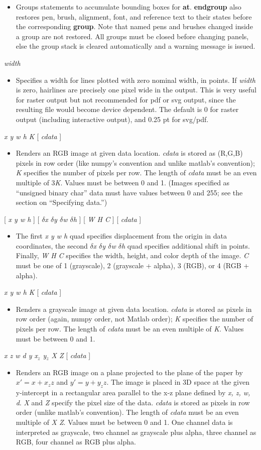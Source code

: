 \documentclass[11pt]{article}
\def\cmd#1#2{\noindent {\bf #1} #2\par}
\def\expl#1{\kern-8pt\begin{itemize}\item[]#1\end{itemize}}
\def\cref#1{{\bf #1}}
\begin{document}
\cmd{group}{}
\cmd{endgroup}{}
\expl{Groups statements to accumulate bounding boxes for
  \cref{at}. \cref{endgroup} also restores pen, brush, alignment,
  font, and
  reference text to their states before the corresponding
  \cref{group}. Note that named pens and brushes changed inside a
  group are not restored. All groups must be closed before changing
  panels, else the group stack is cleared automatically and a warning
  message is issued. }

\cmd{hairline}{\emph{width}} \expl{Specifies a width for lines plotted
  with zero nominal width, in points. If \emph{width} is zero,
  hairlines are precisely one pixel wide in the output. This is very
  useful for raster output but not recommended for pdf or svg output,
  since the resulting file would become device dependent. The default
  is 0 for raster output (including interactive output), and 0.25 pt
  for svg/pdf.}

\cmd{image}{\emph{x y w h K} [ \emph{cdata} ]} \expl{Renders an RGB
  image at given data location. \emph{cdata} is stored as (R,G,B)
  pixels in row order (like numpy's convention and unlike matlab's
  convention); \emph{K} specifies the number of pixels per row. The
  length of \emph{cdata} must be an even multiple of 3\emph{K}. Values
  must be between 0 and 1. (Images specified as ``unsigned  binary
  char'' data must have
  values between 0 and 255; see the section on ``Specifying data.'')}

\cmd{image}{[ \emph{x y w h} ]
  [ \emph{$\delta$x $\delta$y $\delta$w $\delta$h} ] [ \emph{W H C} ] [
    \emph{cdata} ]}
 \expl{The first \emph{x y w h} quad specifies displacement from the origin
in data coordinates, the second  \emph{$\delta$x $\delta$y $\delta$w
  $\delta$h} quad specifies additional shift in points. Finally,
\emph{W H C} specifies the width, height, and color depth of the
image. \emph{C} must be one of 1 (grayscale), 2 (grayscale + alpha), 3
(RGB), or 4 (RGB + alpha).}

\cmd{imageg}{\emph{x y w h K} [ \emph{cdata} ]}
\expl{Renders a grayscale image at given data location. \emph{cdata} is
  stored as pixels in row order (again, numpy order, not Matlab order); 
   \emph{K} specifies
  the number of pixels per row. The length of \emph{cdata} must be an
  even multiple of \emph{K}. Values must be between 0 and 1.}

\cmd{xzimage}{\emph{x z w d y x$_z$ y$_z$ X Z} [ \emph{cdata} ]}
\expl{Renders an RGB image on a plane projected to the plane of
  the paper by $x' = x + x_z z$ and $y' = y + y_z z$. The image is
  placed in 3D space at the given y-intercept in a rectangular area
  parallel to the x-z plane defined by \emph{x, z, w, d}. \emph{X} and
  \emph{Z} specify the pixel size of the data. \emph{cdata} is stored
  as pixels in row order (unlike matlab's convention). The length of
  \emph{cdata} must be an even multiple of \emph{X Z}. Values must be
  between 0 and 1. One channel data is interpreted as grayscale, two
  channel as grayscale plus alpha, three channel as RGB, four channel
  as RGB plus alpha.}
\end{document}
